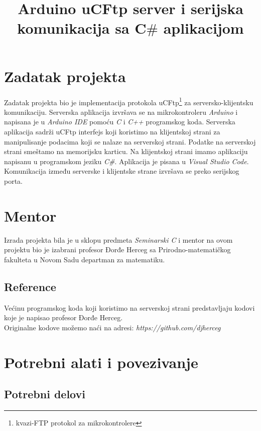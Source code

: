 \documentclass[a4paper]{extarticle}
\title{Arduino uCFtp server i serijska komunikacija sa C$\#$ aplikacijom}
\date{}
\begin{document}
	
	\maketitle
	\tableofcontents
	
	\section{Zadatak projekta}
	 Zadatak projekta bio je implementacija protokola uCFtp\footnote{kvazi-FTP protokol za mikrokontrolere} za serversko-klijentsku komunikaciju. Serverska aplikacija izvršava se na mikrokontroleru \textit{Arduino} i napisana je u \textit{Arduino IDE} pomoću \textit{C} i \textit{C++} programskog koda. Serverska aplikacija sadrži uCFtp interfejs koji koristimo na klijentskoj strani za manipulisanje podacima koji se nalaze na serverskoj strani. Podatke na serverskoj strani smeštamo na memorijsku karticu.
	Na klijentskoj strani imamo aplikaciju napisanu u programskom jeziku \textit{C\#}. Aplikacija je pisana u \textit{Visual Studio Code}. Komunikacija između serverske i klijentske strane izvršava se preko serijskog porta. 
	
	\section{Mentor}
	Izrada projekta bila je u sklopu predmeta \textit{Seminarski C} i mentor na ovom projektu bio je izabrani profesor  Đorđe Herceg  sa Prirodno-matematičkog fakulteta u Novom Sadu departman za matematiku.
	
	\subsection{Reference}
	
	Većinu programskog koda koji koristimo na serverskoj strani predstavljaju kodovi koje je napisao  profesor Đorđe Herceg. \\Originalne kodove možemo naći na adresi: \textit{https://github.com/djherceg}
	
	
	\section{Potrebni alati i povezivanje}
	
	
	\subsection{Potrebni delovi}
	
\end{document}

